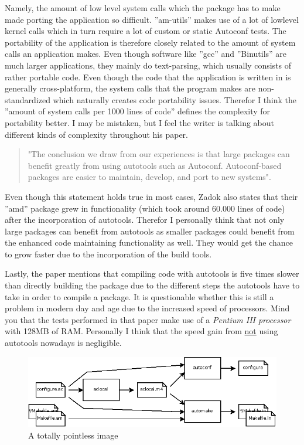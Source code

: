 Namely, the amount of low level system calls which the package has to make made porting the application so difficult. ''am-utils'' makes use of a lot of lowlevel kernel calls which in turn require a lot of custom or static Autoconf tests. The portability of the application is therefore closely related to the amount of system calls an application makes. Even though software like ''gcc'' and ''Binutils'' are much larger applications, they mainly do text-parsing, which usually consists of rather portable code. Even though the code that the application is written in is generally cross-platform, the system calls that the program makes are non-standardized which naturally creates code portability issues. Therefor I think the ''amount of system calls per 1000 lines of code'' defines the complexity for portability better. I may be mistaken, but I feel the writer is talking about different kinds of complexity throughout his paper. 

\begin{quotation}
"The conclusion we draw from our experiences is that large packages can benefit greatly from using autotools such as Autoconf. Autoconf-based packages are easier to maintain, develop, and port to new systems".
\end{quotation}

Even though this statement holds true in most cases, Zadok also states that their ''amd'' package grew in functionality (which took around 60.000 lines of code) after the incorporation of autotools. Therefor I personally think that not only large packages can benefit from autotools as smaller packages could benefit from the enhanced code maintaining functionality as well. They would get the chance to grow faster due to the incorporation of the build tools. 

Lastly, the paper mentions that compiling code with autotools is five times slower than directly building the package due to the different steps the autotools have to take in order to compile a package. It is questionable whether this is still a problem in modern day and age due to the increased speed of processors. Mind you that the tests performed in that paper make use of a \textit{Pentium III processor} with 128MB of RAM. Personally I think that the speed gain from \underline{not} using autotools nowadays is negligible. 

\begin{figure}[H]
	\centering
	\includegraphics[scale=0.4]{./img/autotools.png}
	\caption{A totally pointless image}
	\label{fig:pointlessimage}
\end{figure}

